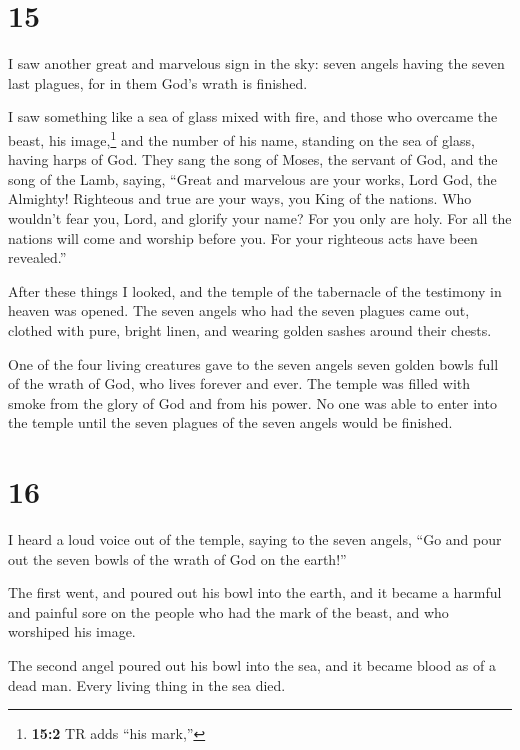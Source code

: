 \hypertarget{section-14}{%
\section{15}\label{section-14}}

 I saw another great and marvelous sign in the sky: seven
angels having the seven last plagues, for in them God's wrath is
finished.

 I saw something like a sea of glass mixed with fire, and
those who overcame the beast, his image,\footnote{\textbf{15:2} TR adds
  ``his mark,''} and the number of his name, standing on the sea of
glass, having harps of God.  They sang the song of Moses,
the servant of God, and the song of the Lamb, saying, ``Great and
marvelous are your works, Lord God, the Almighty! Righteous and true are
your ways, you King of the nations.  Who wouldn't fear
you, Lord, and glorify your name? For you only are holy. For all the
nations will come and worship before you. For your righteous acts have
been revealed.''

 After these things I looked, and the temple of the
tabernacle of the testimony in heaven was opened.  The
seven angels who had the seven plagues came out, clothed with pure,
bright linen, and wearing golden sashes around their chests.

 One of the four living creatures gave to the seven angels
seven golden bowls full of the wrath of God, who lives forever and ever.
 The temple was filled with smoke from the glory of God
and from his power. No one was able to enter into the temple until the
seven plagues of the seven angels would be finished.

\hypertarget{section-15}{%
\section{16}\label{section-15}}

 I heard a loud voice out of the temple, saying to the
seven angels, ``Go and pour out the seven bowls of the wrath of God on
the earth!''

 The first went, and poured out his bowl into the earth,
and it became a harmful and painful sore on the people who had the mark
of the beast, and who worshiped his image.

 The second angel poured out his bowl into the sea, and it
became blood as of a dead man. Every living thing in the sea died.

